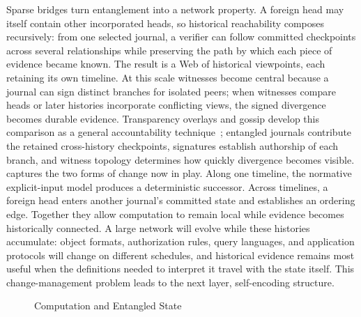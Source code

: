 Sparse bridges turn entanglement into a network property. A foreign head may itself contain other incorporated heads, so historical reachability composes recursively: from one selected journal, a verifier can follow committed checkpoints across several relationships while preserving the path by which each piece of evidence became known. The result is a Web of historical viewpoints, each retaining its own timeline. At this scale witnesses become central because a journal can sign distinct branches for isolated peers; when witnesses compare heads or later histories incorporate conflicting views, the signed divergence becomes durable evidence. Transparency overlays and gossip develop this comparison as a general accountability technique~\cite{Chase2016transparency}; entangled journals contribute the retained cross-history checkpoints, signatures establish authorship of each branch, and witness topology determines how quickly divergence becomes visible.  captures the two forms of change now in play. Along one timeline, the normative explicit-input model produces a deterministic successor. Across timelines, a foreign head enters another journal's committed state and establishes an ordering edge. Together they allow computation to remain local while evidence becomes historically connected. A large network will evolve while these histories accumulate: object formats, authorization rules, query languages, and application protocols will change on different schedules, and historical evidence remains most useful when the definitions needed to interpret it travel with the state itself. This change-management problem leads to the next layer, self-encoding structure.

\begin{figure}[htbp]
  \centering
  \resizebox{\textwidth}{!}{}
  \caption{Computation and Entangled State}
  \label{fig:entangled-state}
\end{figure}